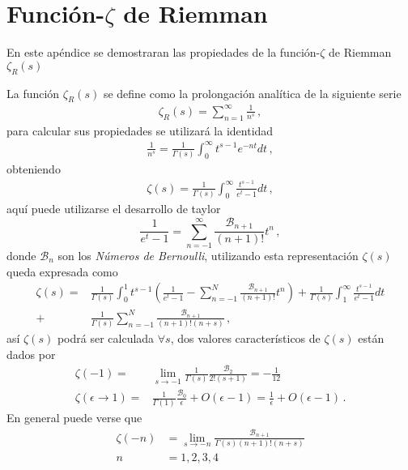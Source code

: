 \chapter{Función-\texorpdfstring{$\zeta$}{}  de Riemman} \label{Apendice.2}

En este apéndice se demostraran las propiedades de la función-$\zeta$ de Riemman $\zeta _R (s)$

La función $\zeta _R (s)$ se define como la prolongación analítica de la siguiente serie
\begin{align}
	\zeta _R (s) = 
	\sum _{n=1} ^{\infty} \frac{1}{n ^{s}}
	\, ,
\end{align}
para calcular sus propiedades se utilizará la identidad
\begin{align}
	\frac{1}{n ^{s}} =
	\frac{1}{\Gamma (s)} 
	\int _0 ^{\infty} t^{s-1} e ^{-n t}  dt
	\, ,
\end{align}
obteniendo
\begin{align}
	\zeta (s) = 
	\frac{1}{\Gamma (s)}
	\int _0 ^\infty
	\frac{t ^{s-1}}{e ^t -1} dt
	\, ,
\end{align}
aquí puede utilizarse el desarrollo de taylor 
\begin{equation}
	\frac{1}{e ^t -1} = 
	\sum _{n=-1} ^{\infty}
	\frac{ \mathcal{B} _{n+1}}{(n+1)!} t ^n
	\, ,
\end{equation}
donde $\mathcal{B} _{n}$ son los {\it Números de Bernoulli}, utilizando esta representación $\zeta (s)$ queda expresada como
\begin{align}
	\zeta (s) = 
&
	\frac{1}{\Gamma (s)}
	\int _0 ^1 
	t ^{s-1} 
	\left(	
		\frac{1}{e ^t -1} -
		\sum _{n=-1} ^{N}
		\frac{ \mathcal{B} _{n+1}}{(n+1)!} t ^n	
		\right)		
		+
	\frac{1}{\Gamma (s)}
	\int _1 ^\infty
	\frac{t ^{s-1}}{e ^t -1} dt
\\
	+
&
	\frac{1}{\Gamma (s)}
	\sum _{n=-1} ^{N}
	\frac{ \mathcal{B} _{n+1}}{ (n+1)! (n + s)}
	\, ,
\end{align}
así $\zeta (s)$ podrá ser calculada $\forall s $, dos valores característicos de $\zeta(s)$ están dados por
\begin{align}
	\zeta (-1) = 
&
	\lim _{s \rightarrow -1}
			\frac{1}{\Gamma (s)} \frac{\mathcal{B} _2}{2! (s+1)}
			 =
	- \frac{1}{12}
\\
	\zeta (\epsilon \rightarrow 1) =
& 
	\frac{1}{\Gamma (1)} \frac{\mathcal{B} _0}{ \epsilon} + O (\epsilon -1 ) = 
	\frac{1}{ \epsilon} + O (\epsilon -1 ) 
	\, .
\end{align}
En general puede verse que
\begin{align}
	\zeta (-n) 
&
	= \lim _{s \rightarrow -n}
	\frac{\mathcal{B} _{n+1}}{\Gamma (s) (n+1)! (n + s)}
\\	
	n 
&
	= 1,2,3,4  
\end{align}


